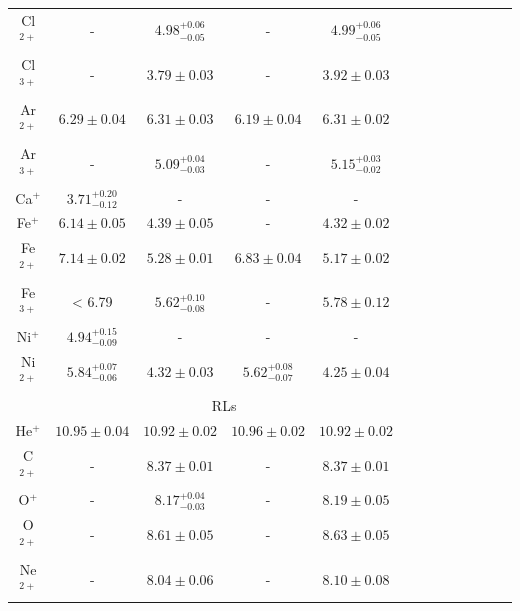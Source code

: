 \documentclass[fleqn,usenatbib]{mnras}
\begin{document}
\begin{table}
\begin{tabular}{ccccccccccccc}
Cl$^{2+}$ &- &$4.98^{+0.06} _{-0.05}$&- &$4.99^{+0.06} _{-0.05}$\\

Cl$^{3+}$ & - &$3.79 \pm 0.03 $&- &$3.92 \pm 0.03 $\\

Ar$^{2+}$ & $6.29 \pm 0.04 $& $6.31 \pm 0.03 $& $6.19 \pm 0.04 $&$6.31 \pm 0.02 $\\

Ar$^{3+}$ & - &$5.09^{+0.04} _{-0.03}$& -&$5.15^{+0.03} _{-0.02}$\\

Ca$^{+}$ & $3.71^{+0.20} _{-0.12}$ &- &-&-\\

Fe$^{+}$ & $6.14 \pm 0.05$ & $4.39 \pm 0.05$ & - &$4.32 \pm 0.02$\\ 

Fe$^{2+}$ & $7.14 \pm 0.02$ & $5.28 \pm 0.01$& $6.83 \pm 0.04$&$5.17 \pm 0.02$\\

Fe$^{3+}$ & < 6.79 &$5.62^{+0.10} _{-0.08}$& -&$5.78 \pm 0.12 $\\

Ni$^{+}$ & $4.94^{+0.15} _{-0.09}$ & - &-&-\\

Ni$^{2+}$ &$5.84^{+0.07} _{-0.06}$ & $4.32 \pm 0.03 $ &$5.62^{+0.08} _{-0.07}$&$4.25 \pm 0.04 $\\

 & \multicolumn{4}{c}{RLs}\\

He$^{+}$  &$10.95 \pm 0.04$  & $10.92 \pm 0.02$& $10.96 \pm 0.02$&$10.92 \pm 0.02$\\

C$^{2+}$  & -& $8.37 \pm 0.01 $ &-&  $8.37 \pm 0.01$ \\

O$^{+}$ & - & $8.17^{+0.04} _{-0.03}$& -& $8.19 \pm 0.05 $ \\

O$^{2+}$ & - & $8.61 \pm 0.05$ & - & $8.63 \pm 0.05$  \\

Ne$^{2+}$ & -&$8.04 \pm 0.06 $&-& $8.10 \pm 0.08 $ \\

\hline
\end{tabular}
\end{table}



\end{document}
